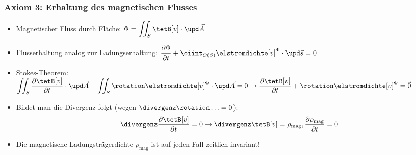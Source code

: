 \begin{frame}
  \frametitle{Axiom 3: Erhaltung des magnetischen Flusses}
\begin{itemize}[<+->]
\item Magnetischer Fluss durch Fläche:
  \(\displaystyle
    \Phi = \iint_S \tetB[v]\cdot \upd\vec{A}
    \)
\item Flusserhaltung analog zur Ladungserhaltung: \(\displaystyle \dfrac{\partial \Phi}{\partial t} + \oiint_{O(S)} \elstromdichte[v]^\Phi \cdot \upd\vec{s} = 0\)

\item Stokes-Theorem: \(\displaystyle \iint_S \frac{\partial \tetB[v]}{\partial t}\cdot\upd\vec{A} + \iint_{S} \rotation \elstromdichte[v]^\Phi \cdot \upd\vec{A} = 0 \to \frac{\partial \tetB[v]}{\partial t}+ \rotation \elstromdichte[v]^\Phi = \vec{0}\)


\item Bildet man die Divergenz folgt (wegen \(\divergenz \rotation \ldots = 0\)):
\begin{equation*}
  \divergenz \frac{\partial \tetB[v]}{\partial t} = 0 \to \divergenz\tetB[v] = \rho_\text{mag} , \frac{\partial \rho_\text{mag}}{\partial t}=0
\end{equation*}

\item Die magnetische Ladungsträgerdichte \(\rho_\text{mag} \) ist auf jeden Fall zeitlich invariant! 
\end{itemize}
\end{frame}




